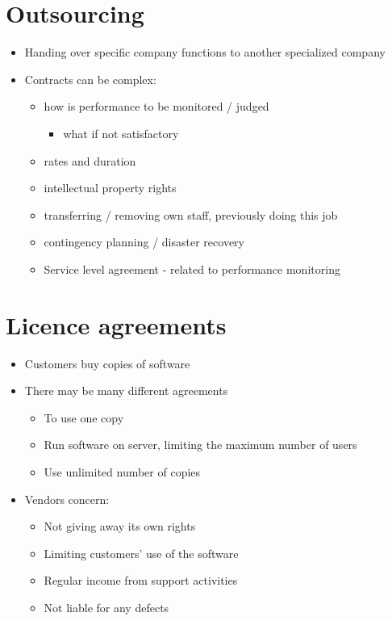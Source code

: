 \documentclass{article}
\begin{document}
\section{Outsourcing}
\begin{itemize}
\item Handing over specific company functions to another specialized company
\item Contracts can be complex:
\begin{itemize}
\item how is performance to be monitored / judged
\begin{itemize}
\item what if not satisfactory
\end{itemize}
\item rates and duration
\item intellectual property rights 
\item transferring / removing own staff, previously doing this job
\item contingency planning / disaster recovery
\item Service level agreement - related to performance monitoring
\end{itemize}
\end{itemize}



\section{Licence agreements}
\begin{itemize}
\item Customers buy copies of software
\item There may be many different agreements
\begin{itemize}
\item To use one copy
\item Run software on server, limiting the maximum number of users
\item Use unlimited number of copies
\end{itemize}
\item Vendors concern:
\begin{itemize}
\item Not giving away its own rights
\item Limiting customers' use of the software
\item Regular income from support activities
\item Not liable for any defects
\end{itemize}
\end{itemize}
\end{document}
